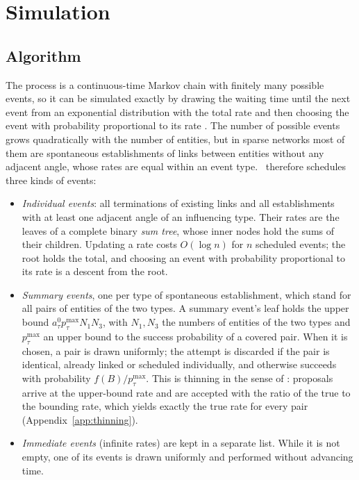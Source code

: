 \section{Simulation}\label{sec:simulation}

\subsection{Algorithm}
The process is a continuous-time Markov chain with finitely many possible events, so it can be simulated exactly by drawing the waiting time until the next event from an exponential distribution with the total rate and then choosing the event with probability proportional to its rate \citep{gillespie1977,bortz1975}.
The number of possible events grows quadratically with the number of entities, but in sparse networks most of them are spontaneous establishments of links between entities without any adjacent angle, whose rates are equal within an event type.
\tricl\ therefore schedules three kinds of events:
\begin{itemize}
\item \emph{Individual events}: all terminations of existing links and all establishments with at least one adjacent angle of an influencing type.
  Their rates are the leaves of a complete binary \emph{sum tree}, whose inner nodes hold the sums of their children.
  Updating a rate costs $O(\log n)$ for $n$ scheduled events; the root holds the total, and choosing an event with probability proportional to its rate is a descent from the root.
\item \emph{Summary events}, one per type of spontaneous establishment, which stand for all pairs of entities of the two types.
  A summary event's leaf holds the upper bound $a^0_\tau p^{\max}_\tau N_1 N_3$, with $N_1, N_3$ the numbers of entities of the two types and $p^{\max}_\tau$ an upper bound to the success probability of a covered pair.
  When it is chosen, a pair is drawn uniformly; the attempt is discarded if the pair is identical, already linked or scheduled individually, and otherwise succeeds with probability $f(B)/p^{\max}_\tau$.
  This is thinning in the sense of \citet{lewis1979}: proposals arrive at the upper-bound rate and are accepted with the ratio of the true to the bounding rate, which yields exactly the true rate for every pair (Appendix~\ref{app:thinning}).
\item \emph{Immediate events} (infinite rates) are kept in a separate list.
  While it is not empty, one of its events is drawn uniformly and performed without advancing time.
\end{itemize}
